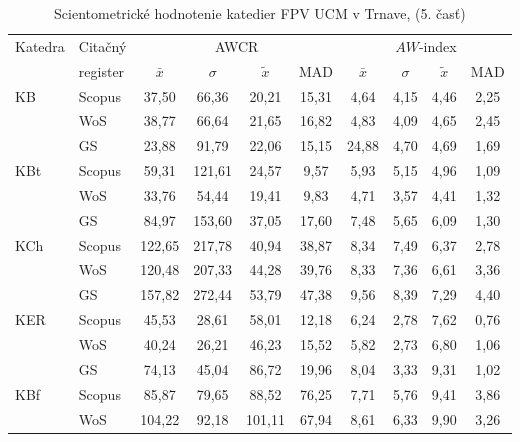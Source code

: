 \begin{table}
  \centering\small
  \caption[Hodnotenie FPV\,--\,AWCR a $AW$-index]{Scientometrické hodnotenie katedier FPV UCM v Trnave, (5. časť)}
\label{tab:5-staff.results}
\begin{tabular}{llcccccccc}
  \toprule\noalign{\vspace{.3ex}}
  Katedra & Citačný  & \multicolumn{4}{c}{AWCR}         & \multicolumn{4}{c}{$AW$-index}  \\
      &  register& $\bar{x}$      & $\sigma$  & $\tilde{x}$ & MAD  & $\bar{x}$      & $\sigma$  & $\tilde{x}$  & MAD  \\[0.3ex]
  \midrule\noalign{\vspace{.5ex}}                                                                                                                         
 KB   & Scopus & 37,50  & 66,36  & 20,21  & 15,31  & 4,64     & 4,15 & 4,46  & 2,25 \\
      & WoS    & 38,77  & 66,64  & 21,65  & 16,82  & 4,83     & 4,09 & 4,65  & 2,45 \\
      & GS     & 23,88  & 91,79  & 22,06  & 15,15  & 24,88    & 4,70 & 4,69  & 1,69 \\[1ex]
 KBt  & Scopus & 59,31  & 121,61 & 24,57  & 9,57   & 5,93     & 5,15 & 4,96  & 1,09 \\
      & WoS    & 33,76  & 54,44  & 19,41  & 9,83   & 4,71     & 3,57 & 4,41  & 1,32 \\
      & GS     & 84,97  & 153,60 & 37,05  & 17,60  & 7,48     & 5,65 & 6,09  & 1,30 \\[1ex]
 KCh  & Scopus & 122,65 & 217,78 & 40,94  & 38,87  & 8,34     & 7,49 & 6,37  & 2,78 \\
      & WoS    & 120,48 & 207,33 & 44,28  & 39,76  & 8,33     & 7,36 & 6,61  & 3,36 \\
      & GS     & 157,82 & 272,44 & 53,79  & 47,38  & 9,56     & 8,39 & 7,29  & 4,40 \\[1ex]
 KER  & Scopus & 45,53  & 28,61  & 58,01  & 12,18  & 6,24     & 2,78 & 7,62  & 0,76 \\
      & WoS    & 40,24  & 26,21  & 46,23  & 15,52  & 5,82     & 2,73 & 6,80  & 1,06 \\
      & GS     & 74,13  & 45,04  & 86,72  & 19,96  & 8,04     & 3,33 & 9,31  & 1,02 \\[1ex]
 KBf  & Scopus & 85,87  & 79,65  & 88,52  & 76,25  & 7,71     & 5,76 & 9,41  & 3,86 \\
      & WoS    & 104,22 & 92,18  & 101,11 & 67,94  & 8,61     & 6,33 & 9,90  & 3,26 \\

\end{tabular}
\end{table}

